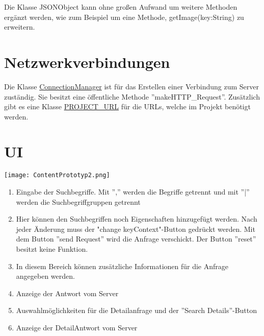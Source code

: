 Die Klasse JSONObject kann ohne großen Aufwand um weitere Methoden ergänzt werden, wie zum Beispiel um eine Methode, getImage(key:String) zu erweitern.


\section{Netzwerkverbindungen}

Die Klasse \href{https://github.com/SECH-Tag-EEXCESS-Browser/iOSX-App/blob/master/Team%20Content/Demos/JSON/Sech/Sech/ConnectionManager.swift}{ConnectionManager} ist für das Erstellen einer Verbindung zum Server zuständig. Sie besitzt eine öffentliche Methode ''makeHTTP\_Request''.
 Zusätzlich gibt es eine Klasse \href{https://github.com/SECH-Tag-EEXCESS-Browser/iOSX-App/blob/master/Team%20Content/Demos/JSON/Sech/Sech/ConnectionManager.swift}{PROJECT\_URL} für die URLs, welche im Projekt benötigt werden.

\section{UI}
\texttt{[image: ContentPrototyp2.png]}
\begin{enumerate}
\item Eingabe der Suchbegriffe. Mit '','' werden die Begriffe getrennt und mit ''|'' werden die Suchbegriffgruppen getrennt
\item Hier können den Suchbegriffen noch Eigenschaften hinzugefügt werden. Nach jeder Änderung muss der "change keyContext"-Button gedrückt werden. Mit dem Button ''send Request'' wird die Anfrage verschickt. Der Button ''reset'' besitzt keine Funktion.
\item In diesem Bereich können zusätzliche Informationen für die Anfrage angegeben werden.
\item Anzeige der Antwort vom Server
\item Auswahlmöglichkeiten für die Detailanfrage und der ''Search Details''-Button
\item Anzeige der DetailAntwort vom Server
\end{enumerate}

